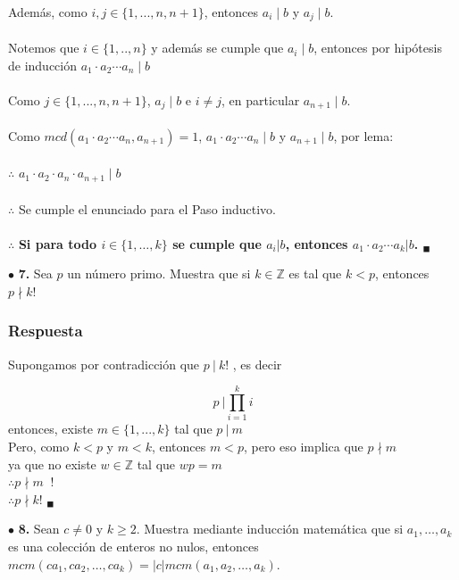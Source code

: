 \documentclass[12pt]{article}
\begin{document}
	Además, como  $i, j \in \{1, ...,n, n+1\}$, entonces $a_i \mid b$ y $a_j\mid b$.\\\\
	Notemos que $i \in \{1,..,n\}$ y además se cumple que $a_i \mid b$, entonces por hipótesis de inducción $a_1 \cdot a_2 \cdots a_n \mid b$\\\\
	Como $j \in \{1, ...,n, n+1\}$, $a_j \mid b$ e $i \neq j$, en particular $a_{n+1} \mid b$.\\\\
	Como $mcd(a_1 \cdot a_2 \cdots a_n, a_{n+1}) = 1$,  $a_1 \cdot a_2 \cdots a_n \mid b$ y $a_{n+1} \mid b$, por lema:\\\\
	$\therefore$ $a_1 \cdot a_2 \cdot  a_n \cdot a_{n + 1} \mid b$ \\\\
	$\therefore$ Se cumple el enunciado para el Paso inductivo.\\\\
	$\therefore$ \textbf{Si para todo $i \in \{1, \dots, k \}$ se cumple que $a_i |b$, entonces
		$a_1 \cdot a_2 \cdots a_k |b$. $_\blacksquare$}
	
	\vspace{1cm}
	
	$\bullet$ \textbf{7.} Sea $p$ un número primo. Muestra que si $k \in \mathbb{Z}$ es tal que $k < p$, entonces $p \nmid k!$
	
	\subsubsection*{Respuesta}
	Supongamos por contradicción que $p \ | \ k!$ , es decir
	
	\[
	p \ | \prod_{i=1}^{k} i
	\]
	entonces, existe $m \in \{1, ... , k\}$ tal que $p \ | \ m$\\
	Pero, como $k<p$ y $m<k$, entonces $m<p$, pero eso implica que $p \nmid m$\\
	ya que no existe $w \in \mathbb{Z}$ tal que $wp = m$\\
	$\therefore p \nmid m \ \textbf{   !}$ \\
	$\therefore p \nmid k!$ $ _{\blacksquare }$
	
	\vspace{1cm}
	
	$\bullet$ \textbf{8.} Sean $c \neq 0$ y $k \geq 2$. Muestra mediante inducción matemática que si $a_1, \dots, a_k$ es una colección de enteros no nulos, entonces $mcm(ca_1, ca_2, \dots, ca_k ) = |c|mcm(a_1, a_2, \dots, a_k )$.
	
\end{document}
